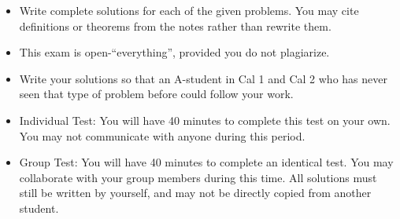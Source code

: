 \documentclass[12pt]{exam}
\newcommand{\<}{\langle}
\renewcommand{\>}{\rangle}
\begin{document}
\begin{center}
\end{center}
\vspace{0.1in}

\vspace{12pt}

\begin{itemize}
  \item Write complete solutions for each of the given problems. You may
        cite definitions or theorems from the notes rather than rewrite them.
  \item This exam is open-``everything'', provided you do not plagiarize.
  \item Write your solutions so that an A-student in Cal 1 and Cal 2
        who has never seen that type of problem before could follow your work.
  \item Individual Test: You will have 40 minutes to complete this test
        on your own. You may not communicate with anyone during this period.
  \item Group Test: You will have 40 minutes to complete an identical test.
        You may collaborate with your group members during this time. All
        solutions must still be written by yourself, and may not be directly
        copied from another student.
\end{itemize}

\newpage
\end{document}
